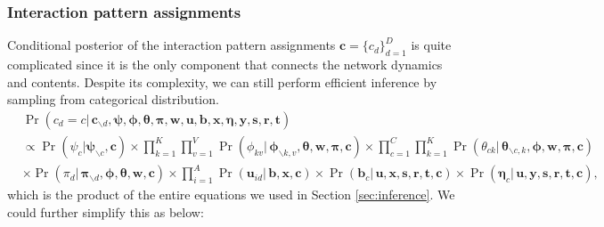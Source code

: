 \documentclass[ba]{imsart}
\numberwithin{equation}{section}
\theoremstyle{plain}
\begin{document}
	\subsubsection{Interaction pattern assignments}
	Conditional posterior of the interaction pattern assignments $\boldsymbol{c}=\{c_d\}_{d=1}^D$ is quite complicated since it is the only component that connects the network dynamics and contents. Despite its complexity, we can still perform efficient inference by sampling from categorical distribution.
		\begin{equation}
		\begin{aligned}
	&	\Pr(c_d=c|\,\boldsymbol{c}_{\backslash d},\boldsymbol{\psi},\boldsymbol{\phi},\boldsymbol{\theta},\boldsymbol{\pi},\boldsymbol{w},\boldsymbol{u},\boldsymbol{b},\boldsymbol{x},\boldsymbol{\eta},\boldsymbol{y},\boldsymbol{s}, \boldsymbol{r},\boldsymbol{t}) \\& \propto \Pr(\psi_c|\boldsymbol{\psi}_{\backslash c}, \boldsymbol{c}) \times 	\prod_{k=1}^K\prod_{v=1}^V\Pr(\phi_{kv}|\,\boldsymbol{\phi}_{\backslash k,v},\boldsymbol{\theta},\boldsymbol{w},\boldsymbol{\pi},\boldsymbol{c}) \times \prod_{c=1}^C\prod_{k=1}^K	\Pr(\theta_{ck}|\,\boldsymbol{\theta}_{\backslash c,k},\boldsymbol{\phi},\boldsymbol{w},\boldsymbol{\pi},\boldsymbol{c})\\&
	\times	\Pr(\pi_d|\,\boldsymbol{\pi}_{\backslash d},\boldsymbol{\phi},\boldsymbol{\theta},\boldsymbol{w},\boldsymbol{c}) \times \prod_{i=1}^A\Pr(\boldsymbol{u}_{id}| \, \boldsymbol{b}, \boldsymbol{x},\boldsymbol{c}) \times \Pr(\boldsymbol{b}_c| \,\boldsymbol{u}, \boldsymbol{x}, \boldsymbol{s}, \boldsymbol{r},\boldsymbol{t},\boldsymbol{c}) \times  \Pr(\boldsymbol{\eta}_c|\, \boldsymbol{u}, \boldsymbol{y},\boldsymbol{s}, \boldsymbol{r},\boldsymbol{t},\boldsymbol{c}),
		\end{aligned}	
		\end{equation}
		which is the product of the entire equations we used in Section \ref{sec:inference}. We could further simplify this as below:
\end{document}

